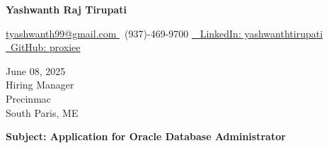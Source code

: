 \documentclass[letterpaper,11pt]{article}
\begin{document}
\begin{center}
    \textbf{\LARGE Yashwanth Raj Tirupati}
    \vspace{4pt}
    
    \small
    \href{mailto:tyashwanth99@gmail.com}{ tyashwanth99@gmail.com }\textbar
     ~(937)-469-9700 \textbar
    \href{https://linkedin.com/in/yashwanthtirupati}{~ LinkedIn: yashwanthtirupati }\textbar 
    \href{https://github.com/proxiee}{~GitHub: proxiee }
\end{center}

\vspace{20pt}

\begin{flushleft}
    June 08, 2025 \\
    \vspace{12pt}
    Hiring Manager \\
    Precinmac \\
    South Paris, ME \\
\end{flushleft}


\begin{flushleft}
\textbf{Subject: Application for Oracle Database Administrator}
\end{flushleft}


\end{document}
